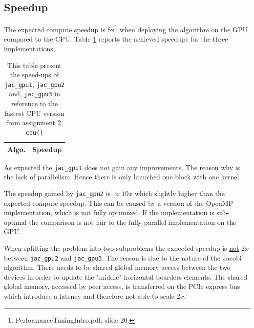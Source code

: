 \subsection{Speedup}
The expected compute speedup is 8x\footnote{PerformanceTuningIntro.pdf, slide 20.} when deploying the algorithm on the GPU compared to the CPU.
Table \ref{tab:speedup_pos} reports the achieved speedups for the three implementations.

\begin{table}[!th]
\centering
\begin{tabular}{l|r}
Algo. & Speedup \\\hline

\end{tabular}
\caption{This table present the speed-ups of \texttt{jac\_gpu1}, \texttt{jac\_gpu2} and, \texttt{jac\_gpu3} in reference to the fastest CPU version from assignment 2, \texttt{cpu()} }
\label{tab:speedup_pos}
\end{table}

\noindent As expected the \texttt{jac\_gpu1} does not gain any improvements. The reason why is the lack of parallelism. Hence there is only launched one block with one kernel.

\noindent The speedup gained by \texttt{jac\_gpu2} is $\approx 10x$ which slightly higher than the expected compute speedup. This can be caused by a version of the OpenMP implementation, which is not fully optimized. If the implementation is sub-optimal the comparison is not fair to the fully parallel implementation on the GPU.

\noindent When splitting the problem into two subproblems the expected speedup is \underline{not} $2x$ between \texttt{jac\_gpu2} and \texttt{jac\_gpu3}. The reason is due to the nature of the Jacobi algorithm. There needs to be shared global memory access between the two devices in order to update the "middle" horizontal boarders elements. The shared global memory, accessed by peer access, is transferred on the PCIe express bus which introduce a latency and therefore not able to scale $2x$. 

    
    
